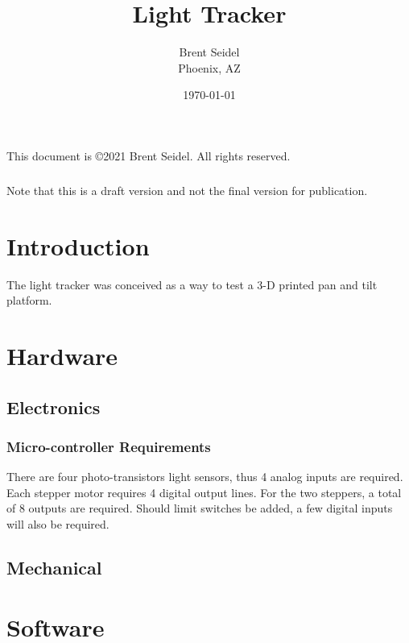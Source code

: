 \documentclass[10pt, openany]{book}
\title{Light Tracker}
\author{Brent Seidel \\ Phoenix, AZ}
\date{ \today }
\begin{document}
%
%
\frontmatter
\maketitle
\begin{center}
This document is \copyright 2021 Brent Seidel.  All rights reserved.

\paragraph{}Note that this is a draft version and not the final version for publication.
\end{center}
\tableofcontents

\mainmatter
\chapter{Introduction}
The light tracker was conceived as a way to test a 3-D printed pan and tilt platform.

\chapter{Hardware}
\section{Electronics}
\subsection{Micro-controller Requirements}
There are four photo-transistors light sensors, thus 4 analog inputs are required.  Each stepper motor requires 4 digital output lines.  For the two steppers, a total of 8 outputs are required.  Should limit switches be added, a few digital inputs will also be required.

\section{Mechanical}

\chapter{Software}
\end{document}
